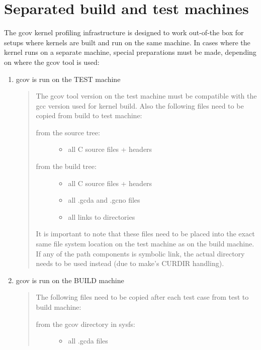 \documentclass[a4paper,8pt,english]{sphinxmanual}
\begin{document}
\section{Separated build and test machines}
\label{dev-tools/gcov:separated-build-and-test-machines}
The gcov kernel profiling infrastructure is designed to work out-of-the
box for setups where kernels are built and run on the same machine. In
cases where the kernel runs on a separate machine, special preparations
must be made, depending on where the gcov tool is used:
\begin{enumerate}
\item {} 
gcov is run on the TEST machine
\begin{quote}

The gcov tool version on the test machine must be compatible with the
gcc version used for kernel build. Also the following files need to be
copied from build to test machine:
\begin{description}
\item[{from the source tree:}] \leavevmode\begin{itemize}
\item {} 
all C source files + headers

\end{itemize}

\item[{from the build tree:}] \leavevmode\begin{itemize}
\item {} 
all C source files + headers

\item {} 
all .gcda and .gcno files

\item {} 
all links to directories

\end{itemize}

\end{description}

It is important to note that these files need to be placed into the
exact same file system location on the test machine as on the build
machine. If any of the path components is symbolic link, the actual
directory needs to be used instead (due to make's CURDIR handling).
\end{quote}

\item {} 
gcov is run on the BUILD machine
\begin{quote}

The following files need to be copied after each test case from test
to build machine:
\begin{description}
\item[{from the gcov directory in sysfs:}] \leavevmode\begin{itemize}
\item {} 
all .gcda files


\end{itemize}
\end{description}
\end{quote}
\end{enumerate}
\end{document}
